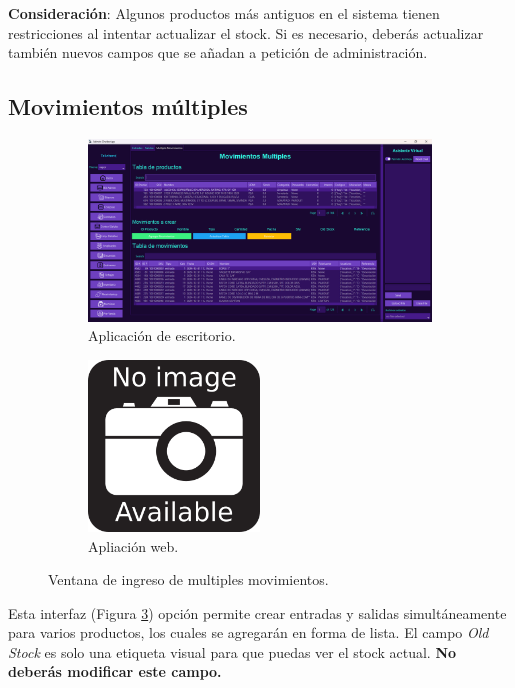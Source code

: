 \textbf{Consideración}: Algunos productos más antiguos en el sistema tienen restricciones al intentar actualizar el stock. Si es necesario, deberás actualizar también nuevos campos que se añadan a petición de administración. 

\subsection{Movimientos múltiples} 
\begin{figure}[ht!]
\centering
\begin{subfigure}{0.45\textwidth}
    \includegraphics[width=\textwidth]{imgs/MultipleMovesApp.png}
    \caption{Aplicación de escritorio.}
    \label{fig:multimoves1}
\end{subfigure}
\hfill
\begin{subfigure}{0.45\textwidth}
    \includegraphics[width=0.5\textwidth]{imgs/no-image.png}
    \caption{Apliación web.}
    \label{fig:multimoves2}
\end{subfigure}        
\caption{Ventana de ingreso de multiples movimientos.}
\label{fig:multimoves}
\end{figure}

Esta  interfaz (Figura \ref{fig:multimoves}) opción permite crear entradas y salidas simultáneamente para varios productos, los cuales se agregarán en forma de lista. El campo \textit{Old Stock} es solo una etiqueta visual para que puedas ver el stock actual. \textbf{No deberás modificar este campo.} 

